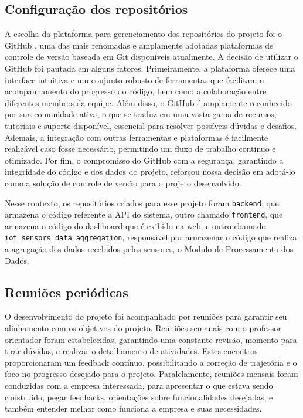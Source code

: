 \subsection{Configuração dos repositórios}
A escolha da plataforma para gerenciamento dos repositórios do projeto foi o GitHub \cite{github}, uma das mais renomadas e amplamente adotadas plataformas de controle de versão baseada em Git disponíveis atualmente. A decisão de utilizar o GitHub foi pautada em alguns fatores. Primeiramente, a plataforma oferece uma interface intuitiva e um conjunto robusto de ferramentas que facilitam o acompanhamento do progresso do código, bem como a colaboração entre diferentes membros da equipe. Além disso, o GitHub é amplamente reconhecido por sua comunidade ativa, o que se traduz em uma vasta gama de recursos, tutoriais e suporte disponível, essencial para resolver possíveis dúvidas e desafios. Ademais, a integração com outras ferramentas e plataformas é facilmente realizável caso fosse necessário, permitindo um fluxo de trabalho contínuo e otimizado. Por fim, o compromisso do GitHub com a segurança, garantindo a integridade do código e dos dados do projeto, reforçou nossa decisão em adotá-lo como a solução de controle de versão para o projeto desenvolvido. 

Nesse contexto, os repositórios criados para esse projeto foram \texttt{backend}, que armazena o código referente a \gls{API} do sistema, outro chamado \texttt{frontend}, que armazena o código do dashboard que é exibido na web, e outro chamado \texttt{iot\_sensors\_data\_aggregation}, responsável por armazenar o código que realiza a agregação dos dados recebidos pelos sensores, o Modulo de Processamento dos Dados.


\subsection{Reuniões periódicas}
O desenvolvimento do projeto foi acompanhado por reuniões para garantir seu alinhamento com os objetivos do projeto. Reuniões semanais com o professor orientador foram estabelecidas, garantindo uma constante revisão, momento para tirar dúvidas, e realizar o detalhamento de atividades. Estes encontros proporcionaram um feedback contínuo, possibilitando a correção de trajetória e o foco no progresso desejado para o projeto. Paralelamente, reuniões mensais foram conduzidas com a empresa interessada, para apresentar o que estava sendo construído, pegar feedbacks, orientações sobre funcionalidades desejadas, e também entender melhor como funciona a empresa e suas necessidades.

